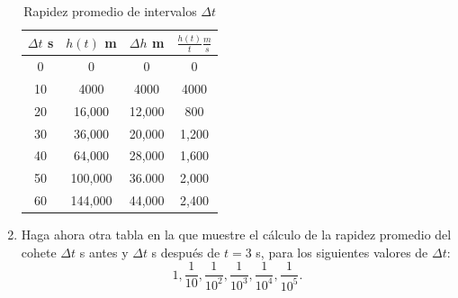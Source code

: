 \documentclass[12pt]{article}
\begin{document}
\begin{enumerate}
  \begin{table}[h]
  
    \begin{center}
  
        \begin{tabular}{| c | c | c |c|}\hline %
            $\Delta t$ s & $h(t)$ m & $\Delta h$ m&$\frac{h(t)}{t}\frac{m}{s}$\\ \hline
            0 & 0 & 0 &0 \\ 
            10& 4000& 4000& 4000 \\
            20&16,000&12,000&800\\
            30&36,000&20,000&1,200\\
            40&64,000&28,000&1,600\\
            50&100,000&36.000&2,000\\
            60& 144,000& 44,000& 2,400 \\ \hline
        \end{tabular}
    
    \caption{Rapidez promedio de intervalos $\Delta t$} 
    
    \label{tab:rapprom}
    
    \end{center}
  
  \end{table}

\item Haga ahora otra tabla en la que muestre el cálculo de la rapidez promedio del cohete $\Delta t$ s antes y $\Delta t$ s después de $t = 3$ s, para los siguientes valores de $\Delta t$:\[1,\frac{1}{10},\frac{1}{10^2},\frac{1}{10^3},\frac{1}{10^4},\frac{1}{10^5}.\]
  

\end{enumerate}
\end{document}
